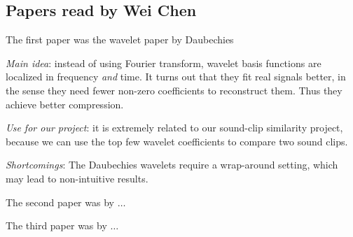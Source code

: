 \subsection{Papers read by Wei Chen}
The first paper was the wavelet paper by Daubechies
\cite{Daubechies92Ten}
\begin{itemize*}
\item {\em Main idea}: instead of using Fourier transform,
      wavelet basis functions are localized in frequency {\em and} time.
      It turns out that they fit real signals better,
      in the sense they need fewer non-zero coefficients to reconstruct
      them. Thus they achieve better compression.
\item {\em Use for our project}:
      it is extremely related to our sound-clip similarity
      project, because we can use the top few wavelet coefficients
      to compare two sound clips.
\item {\em Shortcomings}:
      The Daubechies wavelets require a wrap-around setting,
      which may lead to non-intuitive results.
\end{itemize*}
The second paper was by $\ldots$

The third paper was by $\ldots$